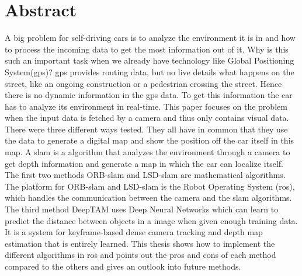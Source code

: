 

\chapter*{Abstract}
A big problem for self-driving cars is to analyze the environment it is in and how to process the incoming data to get the most information out of it.  Why is this such an important task when we already have technology like Global Positioning System(\gls{gps})? \gls{gps} provides routing data, but no live details what happens on the street, like an ongoing construction or a pedestrian crossing the street. Hence there is no dynamic information in the \gls{gps} data. To get this information the car has to analyze its environment in real-time. This paper focuses on the problem when the input data is fetched by a camera and thus only contains visual data. There were three different ways tested. They all have in common that they use the data to generate a digital map and show the position off the car itself in this map. A \gls{slam} is a algorithm that analyzes the environment through a camera to get depth information and generate a map in which the car can localize itself. The first two methods ORB-\gls{slam} and LSD-\gls{slam} are mathematical algorithms. The platform for ORB-\gls{slam} and LSD-\gls{slam} is the Robot Operating System (\gls{ros}), which handles the communication between the camera and the \gls{slam} algorithms. The third method DeepTAM uses Deep Neural Networks which can learn to predict the distance between objects in a image when given enough training data. It is a system for keyframe-based dense camera tracking and depth map estimation that is entirely learned. This thesis shows how to implement the different algorithms in \gls{ros} and points out the pros and cons of each method compared to the others and gives an outlook into future methods.
\newline
\newline
\newline
\newline
